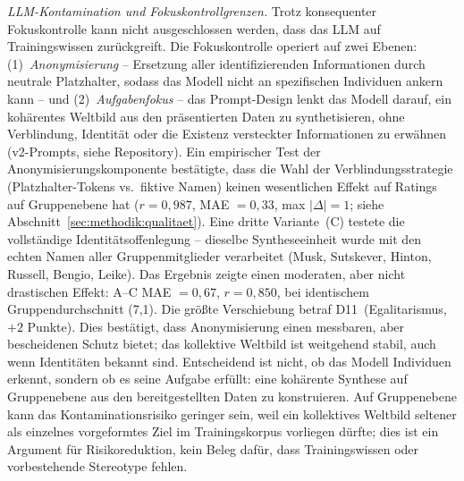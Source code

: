 \documentclass[12pt,a4paper]{article}
\begin{document}
\emph{LLM-Kontamination und Fokuskontrollgrenzen.} Trotz konsequenter Fokuskontrolle kann nicht ausgeschlossen werden, dass das LLM auf Trainingswissen zurückgreift. Die Fokuskontrolle operiert auf zwei Ebenen: (1)~\emph{Anonymisierung} -- Ersetzung aller identifizierenden Informationen durch neutrale Platzhalter, sodass das Modell nicht an spezifischen Individuen ankern kann -- und (2)~\emph{Aufgabenfokus} -- das Prompt-Design lenkt das Modell darauf, ein kohärentes Weltbild aus den präsentierten Daten zu synthetisieren, ohne Verblindung, Identität oder die Existenz versteckter Informationen zu erwähnen (v2-Prompts, siehe Repository). Ein empirischer Test der Anonymisierungskomponente bestätigte, dass die Wahl der Verblindungsstrategie (Platzhalter-Tokens vs.\ fiktive Namen) keinen wesentlichen Effekt auf Ratings auf Gruppenebene hat ($r = 0{,}987$, MAE $= 0{,}33$, max $|\Delta| = 1$; siehe Abschnitt~\ref{sec:methodik:qualitaet}). Eine dritte Variante~(C) testete die vollständige Identitätsoffenlegung -- dieselbe Syntheseeinheit wurde mit den echten Namen aller Gruppenmitglieder verarbeitet (Musk, Sutskever, Hinton, Russell, Bengio, Leike). Das Ergebnis zeigte einen moderaten, aber nicht drastischen Effekt: A--C MAE $= 0{,}67$, $r = 0{,}850$, bei identischem Gruppendurchschnitt (7,1). Die größte Verschiebung betraf D11~(Egalitarismus, $+2$ Punkte). Dies bestätigt, dass Anonymisierung einen messbaren, aber bescheidenen Schutz bietet; das kollektive Weltbild ist weitgehend stabil, auch wenn Identitäten bekannt sind. Entscheidend ist nicht, ob das Modell Individuen erkennt, sondern ob es seine Aufgabe erfüllt: eine kohärente Synthese auf Gruppenebene aus den bereitgestellten Daten zu konstruieren. Auf Gruppenebene kann das Kontaminationsrisiko geringer sein, weil ein kollektives Weltbild seltener als einzelnes vorgeformtes Ziel im Trainingskorpus vorliegen dürfte; dies ist ein Argument für Risikoreduktion, kein Beleg dafür, dass Trainingswissen oder vorbestehende Stereotype fehlen.
\end{document}

